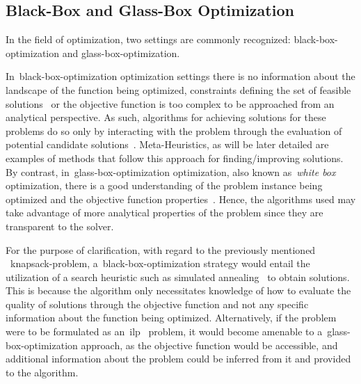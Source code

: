 \subsection{Black-Box and Glass-Box Optimization}
\label{subsec:bbo-and-gbo}


In the field of optimization, two settings are commonly recognized:
\acrfull{black-box-optimization} and \acrfull{glass-box-optimization}.

In~\acrshort{black-box-optimization} optimization settings there is no
information about the landscape of the function being optimized, constraints
defining the set of feasible solutions~\cite{alarie2021two} or the objective
function is too complex to be approached from an analytical perspective. As
such, algorithms for achieving solutions for these problems do so only by
interacting with the problem through the evaluation of potential candidate
solutions~\cite{doerr2020complexity,gutjahr2010stochastic}. Meta-Heuristics, as
will be later detailed are examples of methods that follow this approach for
finding/improving solutions. By contrast, in~\acrshort{glass-box-optimization}
optimization, also known as~\textit{white box} optimization, there is a good
understanding of the problem instance being optimized and the objective function
properties~\cite{doerr2020complexity}. Hence, the algorithms used may take
advantage of more analytical properties of the problem since they are
transparent to the solver.

For the purpose of clarification, with regard to the previously mentioned
~\acrshort{knapsack-problem}, a~\acrshort{black-box-optimization} strategy would
entail the utilization of a search heuristic such as simulated
annealing~\cite{luke2013essentialsa} to obtain solutions. This is because the
algorithm only necessitates knowledge of how to evaluate the quality of
solutions through the objective function and not any specific information about
the function being optimized. Alternatively, if the problem were to be
formulated as an~\acrfull{ilp}~\cite{nocedal2006numerical,papadimitriou1998combinatorial}
problem, it would become amenable to a~\acrshort{glass-box-optimization}
approach, as the objective function would be accessible, and additional
information about the problem could be inferred from it and provided to the
algorithm.

